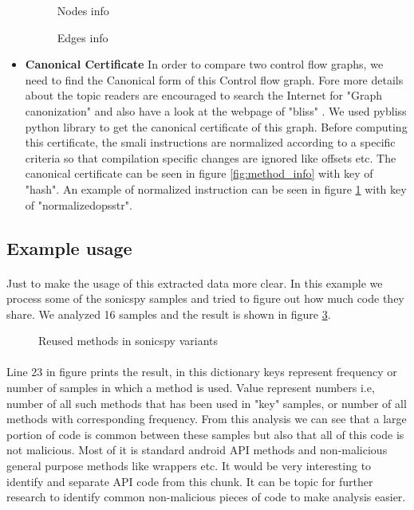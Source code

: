 \documentclass[../main.tex]{subfile}
\begin{document}
\begin{itemize}
			\begin{figure}[H]
				\centering
				\caption{Nodes info}
				\label{fig:nodes_info}	
			\end{figure}

			\begin{figure}[H]
				\centering
				\caption{Edges info}
				\label{fig:edges_info}	
			\end{figure}
		

			\item \textbf{Canonical Certificate} In order to compare two control flow graphs, we need to find the Canonical form of this Control flow graph. Fore more details about the topic readers are encouraged to search the Internet for "Graph canonization" and also have a look at the webpage of "bliss" \cite{bliss}. We used pybliss python library \cite{bliss} \cite{junttila2007engineering} to get the canonical certificate of this graph. Before computing this certificate, the smali instructions are normalized according to a specific criteria so that compilation specific changes are ignored like offsets etc. The canonical certificate can be seen in figure \ref{fig:method_info} with key of "hash". An example of normalized instruction can be seen in figure \ref{fig:nodes_info} with key of "normalized\textunderscore ops\textunderscore str".
		\end{itemize}
		
		\subsection{Example usage}
		\paragraph{}Just to make the usage of this extracted data more clear. In this example we process some of the sonicspy samples and tried to figure out how much code they share. We analyzed 16 samples and the result is shown in figure \ref{fig:sonicspy_freq}.
		
		\begin{figure}[H]
			\centering
			\caption{Reused methods in sonicspy variants}
			\label{fig:sonicspy_freq}
		\end{figure}
		\paragraph{} Line 23 in figure prints the result, in this dictionary keys represent frequency or number of samples in which a method is used. Value represent numbers i.e, number of all such methods that has been used in "key" samples, or number of all methods with corresponding frequency. From this analysis we can see that a large portion of code is common between these samples but also that all of this code is not malicious. Most of it is standard android API methods and non-malicious general purpose methods like wrappers etc. It would be very interesting to identify and separate API code from this chunk. It can be topic for further research to identify common non-malicious pieces of code to make analysis easier. 
\end{document}
